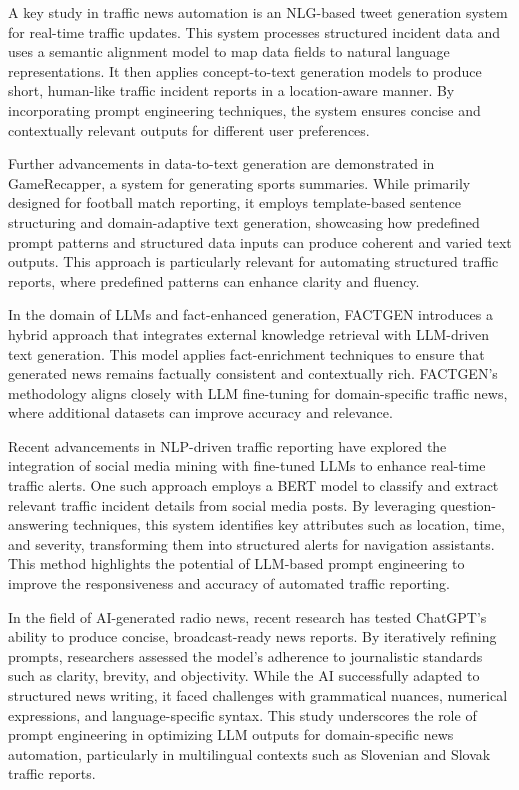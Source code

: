 \documentclass[fleqn,moreauthors,10pt]{ds_report}
\begin{document}
A key study in traffic news automation is an NLG-based tweet generation system for real-time traffic updates. This system processes structured incident data and uses a semantic alignment model to map data fields to natural language representations. It then applies concept-to-text generation models to produce short, human-like traffic incident reports in a location-aware manner. By incorporating prompt engineering techniques, the system ensures concise and contextually relevant outputs for different user preferences. \cite{tran2016automatic}

Further advancements in data-to-text generation are demonstrated in GameRecapper, a system for generating sports summaries. While primarily designed for football match reporting, it employs template-based sentence structuring and domain-adaptive text generation, showcasing how predefined prompt patterns and structured data inputs can produce coherent and varied text outputs. This approach is particularly relevant for automating structured traffic reports, where predefined patterns can enhance clarity and fluency. \cite{aires2016automatic}

In the domain of LLMs and fact-enhanced generation, FACTGEN introduces a hybrid approach that integrates external knowledge retrieval with LLM-driven text generation. This model applies fact-enrichment techniques to ensure that generated news remains factually consistent and contextually rich. FACTGEN’s methodology aligns closely with LLM fine-tuning for domain-specific traffic news, where additional datasets can improve accuracy and relevance. \cite{shu2021fact}

Recent advancements in NLP-driven traffic reporting have explored the integration of social media mining with fine-tuned LLMs to enhance real-time traffic alerts. One such approach employs a BERT model to classify and extract relevant traffic incident details from social media posts. By leveraging question-answering techniques, this system identifies key attributes such as location, time, and severity, transforming them into structured alerts for navigation assistants. This method highlights the potential of LLM-based prompt engineering to improve the responsiveness and accuracy of automated traffic reporting. \cite{wan2020empowering}

In the field of AI-generated radio news, recent research has tested ChatGPT’s ability to produce concise, broadcast-ready news reports. By iteratively refining prompts, researchers assessed the model’s adherence to journalistic standards such as clarity, brevity, and objectivity. While the AI successfully adapted to structured news writing, it faced challenges with grammatical nuances, numerical expressions, and language-specific syntax. This study underscores the role of prompt engineering in optimizing LLM outputs for domain-specific news automation, particularly in multilingual contexts such as Slovenian and Slovak traffic reports. \cite{janavckova2024news}
\end{document}
